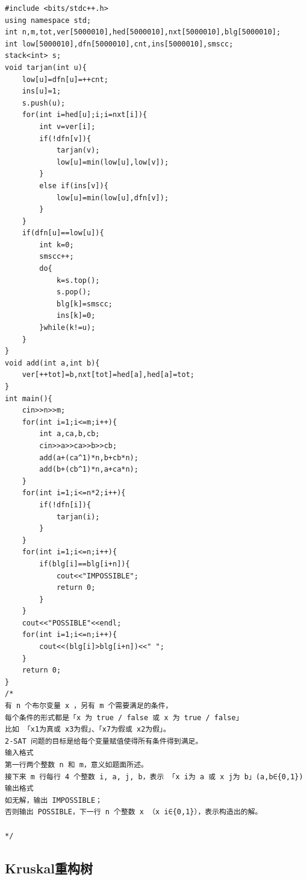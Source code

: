 \documentclass[11pt,a4paper]{ctexart}
\begin{document}
\begin{lstlisting}
#include <bits/stdc++.h>
using namespace std;
int n,m,tot,ver[5000010],hed[5000010],nxt[5000010],blg[5000010];
int low[5000010],dfn[5000010],cnt,ins[5000010],smscc;
stack<int> s;
void tarjan(int u){
	low[u]=dfn[u]=++cnt;
	ins[u]=1;
	s.push(u);
	for(int i=hed[u];i;i=nxt[i]){
		int v=ver[i];
		if(!dfn[v]){
			tarjan(v);
			low[u]=min(low[u],low[v]);
		}
		else if(ins[v]){
			low[u]=min(low[u],dfn[v]);
		}
	}
	if(dfn[u]==low[u]){
		int k=0;
		smscc++;
		do{
			k=s.top();
			s.pop();
			blg[k]=smscc;
			ins[k]=0;
		}while(k!=u);
	}
}
void add(int a,int b){
	ver[++tot]=b,nxt[tot]=hed[a],hed[a]=tot;
}
int main(){
    cin>>n>>m;
    for(int i=1;i<=m;i++){
		int a,ca,b,cb;
		cin>>a>>ca>>b>>cb;
		add(a+(ca^1)*n,b+cb*n);
		add(b+(cb^1)*n,a+ca*n);	
	}
	for(int i=1;i<=n*2;i++){
		if(!dfn[i]){
			tarjan(i);
		}
	}
	for(int i=1;i<=n;i++){
		if(blg[i]==blg[i+n]){
			cout<<"IMPOSSIBLE";
			return 0;
		}
	}
	cout<<"POSSIBLE"<<endl;
	for(int i=1;i<=n;i++){
		cout<<(blg[i]>blg[i+n])<<" ";
	}
    return 0;
}
/*
有 n 个布尔变量 x ，另有 m 个需要满足的条件，
每个条件的形式都是「x 为 true / false 或 x 为 true / false」
比如 「x1为真或 x3为假」、「x7为假或 x2为假」。
2-SAT 问题的目标是给每个变量赋值使得所有条件得到满足。
输入格式
第一行两个整数 n 和 m，意义如题面所述。
接下来 m 行每行 4 个整数 i, a, j, b，表示 「x i为 a 或 x j为 b」(a,b∈{0,1})
输出格式
如无解，输出 IMPOSSIBLE；
否则输出 POSSIBLE，下一行 n 个整数 x （x i∈{0,1}），表示构造出的解。

*/
\end{lstlisting}

\subsection{Kruskal重构树}
\end{document}
